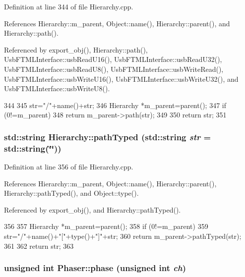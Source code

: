 Definition at line 344 of file Hierarchy.cpp.

References Hierarchy::m\_\-parent, Object::name(), Hierarchy::parent(), and Hierarchy::path().

Referenced by export\_\-obj(), Hierarchy::path(), UsbFTMLInterface::usbReadU16(), UsbFTMLInterface::usbReadU32(), UsbFTMLInterface::usbReadU8(), UsbFTMLInterface::usbWriteRead(), UsbFTMLInterface::usbWriteU16(), UsbFTMLInterface::usbWriteU32(), and UsbFTMLInterface::usbWriteU8().


\begin{DoxyCode}
344                                       {
345   str="/"+name()+str;
346   Hierarchy *m_parent=parent();
347   if (0!=m_parent){
348     return m_parent->path(str);
349   }
350   return str;
351 }
\end{DoxyCode}
\hypertarget{classHierarchy_a1efd56cd164d328d2002e53a10a19b8c}{
\subsubsection[{pathTyped}]{\setlength{\rightskip}{0pt plus 5cm}std::string Hierarchy::pathTyped (std::string {\em str} = {\ttfamily std::string(\char`\"{}\char`\"{})})}}
\label{classHierarchy_a1efd56cd164d328d2002e53a10a19b8c}


Definition at line 356 of file Hierarchy.cpp.

References Hierarchy::m\_\-parent, Object::name(), Hierarchy::parent(), Hierarchy::pathTyped(), and Object::type().

Referenced by export\_\-obj(), and Hierarchy::pathTyped().


\begin{DoxyCode}
356                                            {
357   Hierarchy *m_parent=parent();
358   if (0!=m_parent){
359     str="/"+name()+"["+type()+"]"+str;
360     return m_parent->pathTyped(str);
361   }
362   return str;
363 }
\end{DoxyCode}
\hypertarget{classPhaser_a3928ba4f1421c83b2f7783da87727ff2}{
\subsubsection[{phase}]{\setlength{\rightskip}{0pt plus 5cm}unsigned int Phaser::phase (unsigned int {\em ch})}}
\label{classPhaser_a3928ba4f1421c83b2f7783da87727ff2}


